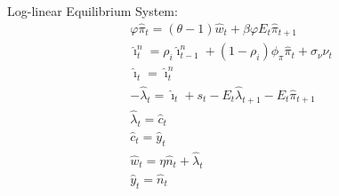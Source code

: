 \documentclass[12pt, final]{article}
\begin{document}
\setcounter{equation}{0}
\noindent Log-linear Equilibrium System:
\begin{gather}
  \varphi\hat{\pi}_t = (\theta-1)\hat{w}_t+\beta\varphi E_t\hat{\pi}_{t+1}\\
  \hat{\imath}_t^n = \rho_i\hat{\imath}^n_{t-1} + (1-\rho_i)\phi_\pi\hat{\pi}_t+\sigma_\nu\nu_t \\
  \hat{\imath}_t = \hat{\imath}_t^n\\
    -\hat{\lambda}_t = \hat{\imath}_t + s_t - E_t\hat{\lambda}_{t+1} - E_t\hat{\pi}_{t+1} \\
  \hat{\lambda}_t = \hat{c}_t \\
  \hat{c}_t = \hat{y}_t\\
  \hat{w}_t =  \eta\hat{n}_t + \hat{\lambda}_t\\
  \hat{y}_t = \hat{n}_t
\end{gather}
\end{document}
